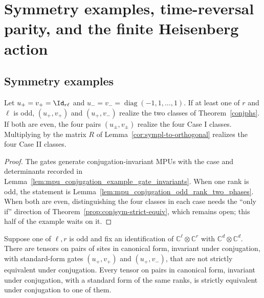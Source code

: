 \section{Symmetry examples, time-reversal parity, and the finite Heisenberg action}

\subsection{Symmetry examples}

\begin{lemma}
    \label{ex:all-phases-under-conjugation}
    \notready
    Let $u_+=v_+=\Id_{r\ell}$ and
    $u_-=v_-=\operatorname{diag}(-1,1,\ldots,1)$. If at least one of $r$ and
    $\ell$ is odd, $(u_+,v_+)$ and $(u_+,v_-)$ realize the two classes of
    Theorem~\ref{conjphs}. If both are even, the four pairs $(u_\pm,v_\pm)$
    realize the four Case I classes. Multiplying by the matrix $R$ of
    Lemma~\ref{cor:sympl-to-orthogonal} realizes the four Case II classes.
\end{lemma}

\begin{proof}
    The gates generate conjugation-invariant MPUs with the case and
    determinants recorded in
    Lemma~\ref{lem:mpu_conjugation_example_gate_invariants}. When one rank is
    odd, the statement is
    Lemma~\ref{lem:mpu_conjugation_odd_rank_two_phases}. When both are even,
    distinguishing the four classes in each case needs the ``only if''
    direction of Theorem~\ref{prop:conjsym-strict-equiv}, which remains open;
    this half of the example waits on it.
\end{proof}

\begin{lemma}
    \label{lem:mpu_conjugation_odd_rank_two_phases}
    \leanok
    Suppose one of $\ell,r$ is odd and fix an identification of
    $\mathbb C^\ell\otimes\mathbb C^r$ with $\mathbb C^d\otimes\mathbb C^d$. There
    are tensors on pairs of sites in canonical form, invariant under
    conjugation, with standard-form gates $(u_+,v_+)$ and $(u_+,v_-)$, that are
    not strictly equivalent under conjugation. Every tensor on pairs in canonical
    form, invariant under conjugation, with a standard form of the same ranks, is
    strictly equivalent under conjugation to one of them.
\end{lemma}

